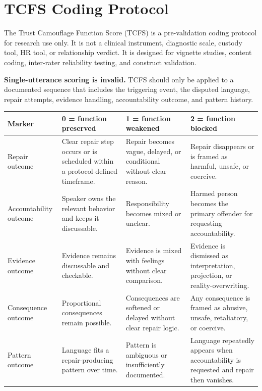 \documentclass[11pt, letterpaper]{article}
\newcommand{\term}[1]{\textbf{#1}}
\begin{document}
\section{TCFS Coding Protocol}

The Trust Camouflage Function Score (TCFS) is a pre-validation coding protocol for research use only. It is not a clinical instrument, diagnostic scale, custody tool, HR tool, or relationship verdict. It is designed for vignette studies, content coding, inter-rater reliability testing, and construct validation.

\term{Single-utterance scoring is invalid.} TCFS should only be applied to a documented sequence that includes the triggering event, the disputed language, repair attempts, evidence handling, accountability outcome, and pattern history.

\begin{center}
\small
{}
\setlength{\tabcolsep}{4pt}
\renewcommand{\arraystretch}{1.18}
\begin{tabularx}{\textwidth}{ZYYY}
\toprule
\textbf{Marker} & \textbf{0 = function preserved} & \textbf{1 = function weakened} & \textbf{2 = function blocked} \\
\midrule
Repair outcome & Clear repair step occurs or is scheduled within a protocol-defined timeframe. & Repair becomes vague, delayed, or conditional without clear reason. & Repair disappears or is framed as harmful, unsafe, or coercive. \\
\addlinespace[0.35em]
Accountability outcome & Speaker owns the relevant behavior and keeps it discussable. & Responsibility becomes mixed or unclear. & Harmed person becomes the primary offender for requesting accountability. \\
\addlinespace[0.35em]
Evidence outcome & Evidence remains discussable and checkable. & Evidence is mixed with feelings without clear comparison. & Evidence is dismissed as interpretation, projection, or reality-overwriting. \\
\addlinespace[0.35em]
Consequence outcome & Proportional consequences remain possible. & Consequences are softened or delayed without clear repair logic. & Any consequence is framed as abusive, unsafe, retaliatory, or coercive. \\
\addlinespace[0.35em]
Pattern outcome & Language fits a repair-producing pattern over time. & Pattern is ambiguous or insufficiently documented. & Language repeatedly appears when accountability is requested and repair then vanishes. \\
\bottomrule
\end{tabularx}
\end{center}
\end{document}
